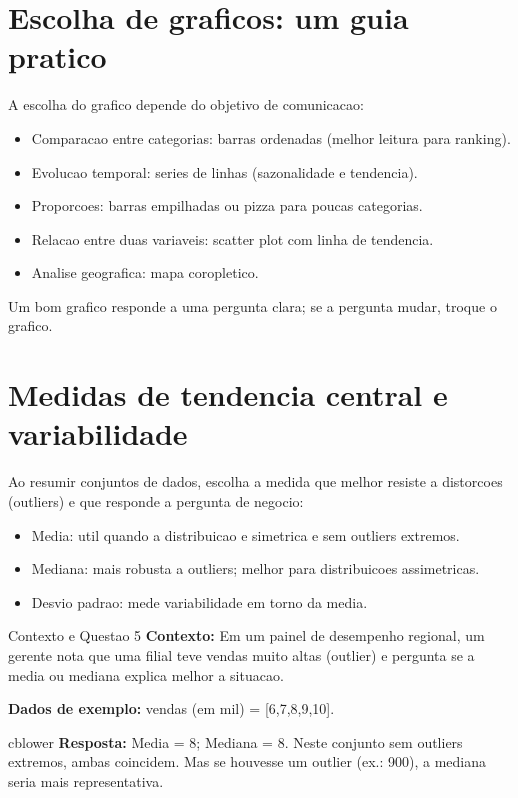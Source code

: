 \section{Escolha de graficos: um guia pratico}

A escolha do grafico depende do objetivo de comunicacao:
\begin{itemize}
  \item Comparacao entre categorias: barras ordenadas (melhor leitura para ranking).
  \item Evolucao temporal: series de linhas (sazonalidade e tendencia).
  \item Proporcoes: barras empilhadas ou pizza para poucas categorias.
  \item Relacao entre duas variaveis: scatter plot com linha de tendencia.
  \item Analise geografica: mapa coropletico.
\end{itemize}

Um bom grafico responde a uma pergunta clara; se a pergunta mudar, troque o grafico.

\section{Medidas de tendencia central e variabilidade}

Ao resumir conjuntos de dados, escolha a medida que melhor resiste a distorcoes (outliers) e que responde a pergunta de negocio:
\begin{itemize}
  \item Media: util quando a distribuicao e simetrica e sem outliers extremos.
  \item Mediana: mais robusta a outliers; melhor para distribuicoes assimetricas.
  \item Desvio padrao: mede variabilidade em torno da media.
\end{itemize}

\begin{SolvedBox}{Contexto e Questao 5}
	\textbf{Contexto:} Em um painel de desempenho regional, um gerente nota que uma filial teve vendas muito altas (outlier) e pergunta se a media ou mediana explica melhor a situacao.

	\textbf{Dados de exemplo:} vendas (em mil) = [6,7,8,9,10].

	cblower
	\textbf{Resposta:} Media = 8; Mediana = 8. Neste conjunto sem outliers extremos, ambas coincidem. Mas se houvesse um outlier (ex.: 900), a mediana seria mais representativa.
\end{SolvedBox}

